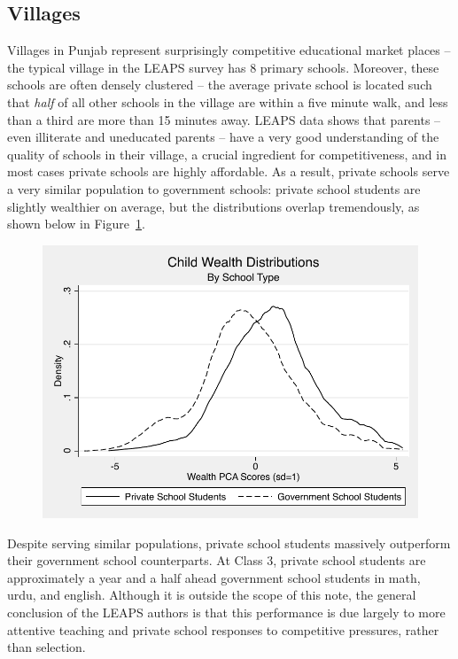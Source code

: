\documentclass[12pt]{article}
\begin{document}
\subsection{Villages}\label{}

Villages in Punjab represent surprisingly competitive educational market places -- the typical village in the LEAPS survey has 8 primary schools. Moreover, these schools are often densely clustered -- the average private school is located such that \emph{half} of all other schools in the village are within a five minute walk, and less than a third are more than 15 minutes away. LEAPS data shows that parents -- even illiterate and uneducated parents -- have a very good understanding of the quality of schools in their village, a crucial ingredient for competitiveness, and in most cases private schools are highly affordable. As a result, private schools serve a very similar population to government schools: private school students are slightly wealthier on average, but the distributions overlap tremendously, as shown below in Figure~\ref{wealthdist}. 


\begin{figure}[htb]
	\begin{center}
	\caption{}\label{wealthdist}
	\includegraphics[scale=1.0]{graphs/wealth_and_type.pdf}
	\end{center}
\end{figure}


Despite serving similar populations, private school students massively outperform their government school counterparts. At Class 3, private school students are approximately a year and a half ahead government school students in math, urdu, and english. Although it is outside the scope of this note, the general conclusion of the LEAPS authors is that this performance is due largely to more attentive teaching and private school responses to competitive pressures, rather than selection. 
\end{document}
